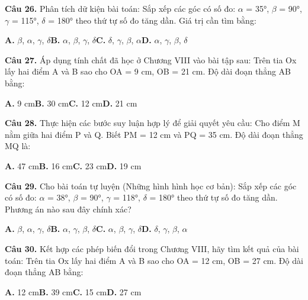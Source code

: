 \documentclass[11pt,a4paper]{article}
\begin{document}
\textbf{\color{primary} Câu 26.} Phân tích dữ kiện bài toán: Sắp xếp các góc có số đo: $\alpha$ = 35°, $\beta$ = 90°, $\gamma$ = 115°, $\delta$ = 180° theo thứ tự số đo tăng dần. Giá trị cần tìm bằng:\par
\hspace*{1.5em}\textbf{A.} $\beta$, $\alpha$, $\gamma$, $\delta$\quad\quad \textbf{B.} $\alpha$, $\beta$, $\gamma$, $\delta$\quad\quad \textbf{C.} $\delta$, $\gamma$, $\beta$, $\alpha$\quad\quad \textbf{D.} $\alpha$, $\gamma$, $\beta$, $\delta$\par\vspace{2pt}
\textbf{\color{primary} Câu 27.} Áp dụng tính chất đã học ở Chương VIII vào bài tập sau: Trên tia Ox lấy hai điểm A và B sao cho OA = 9 cm, OB = 21 cm. Độ dài đoạn thẳng AB bằng:\par
\hspace*{1.5em}\textbf{A.} 9 cm\quad\quad \textbf{B.} 30 cm\quad\quad \textbf{C.} 12 cm\quad\quad \textbf{D.} 21 cm\par\vspace{2pt}
\textbf{\color{primary} Câu 28.} Thực hiện các bước suy luận hợp lý để giải quyết yêu cầu: Cho điểm M nằm giữa hai điểm P và Q. Biết PM = 12 cm và PQ = 35 cm. Độ dài đoạn thẳng MQ là:\par
\hspace*{1.5em}\textbf{A.} 47 cm\quad\quad \textbf{B.} 16 cm\quad\quad \textbf{C.} 23 cm\quad\quad \textbf{D.} 19 cm\par\vspace{2pt}
\textbf{\color{primary} Câu 29.} Cho bài toán tự luyện (Những hình hình học cơ bản): Sắp xếp các góc có số đo: $\alpha$ = 38°, $\beta$ = 90°, $\gamma$ = 118°, $\delta$ = 180° theo thứ tự số đo tăng dần. Phương án nào sau đây chính xác?\par
\hspace*{1.5em}\textbf{A.} $\beta$, $\alpha$, $\gamma$, $\delta$\quad\quad \textbf{B.} $\alpha$, $\gamma$, $\beta$, $\delta$\quad\quad \textbf{C.} $\alpha$, $\beta$, $\gamma$, $\delta$\quad\quad \textbf{D.} $\delta$, $\gamma$, $\beta$, $\alpha$\par\vspace{2pt}
\textbf{\color{primary} Câu 30.} Kết hợp các phép biến đổi trong Chương VIII, hãy tìm kết quả của bài toán: Trên tia Ox lấy hai điểm A và B sao cho OA = 12 cm, OB = 27 cm. Độ dài đoạn thẳng AB bằng:\par
\hspace*{1.5em}\textbf{A.} 12 cm\quad\quad \textbf{B.} 39 cm\quad\quad \textbf{C.} 15 cm\quad\quad \textbf{D.} 27 cm\par\vspace{2pt}
\end{document}
